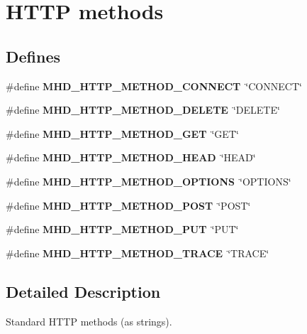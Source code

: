 \hypertarget{group__methods}{\section{\-H\-T\-T\-P methods}
\label{group__methods}
}
\subsection*{\-Defines}
\begin{DoxyCompactItemize}
\item 
\hypertarget{group__methods_gae328c5a44dfed584d65b72c46cf058e5}{\#define {\bfseries \-M\-H\-D\-\_\-\-H\-T\-T\-P\-\_\-\-M\-E\-T\-H\-O\-D\-\_\-\-C\-O\-N\-N\-E\-C\-T}~\char`\"{}\-C\-O\-N\-N\-E\-C\-T\char`\"{}}\label{group__methods_gae328c5a44dfed584d65b72c46cf058e5}

\item 
\hypertarget{group__methods_gae8a91999c163ab09633f5cb62f4bf216}{\#define {\bfseries \-M\-H\-D\-\_\-\-H\-T\-T\-P\-\_\-\-M\-E\-T\-H\-O\-D\-\_\-\-D\-E\-L\-E\-T\-E}~\char`\"{}\-D\-E\-L\-E\-T\-E\char`\"{}}\label{group__methods_gae8a91999c163ab09633f5cb62f4bf216}

\item 
\hypertarget{group__methods_ga430f578ef03fbfd74303abcf5acd7f2b}{\#define {\bfseries \-M\-H\-D\-\_\-\-H\-T\-T\-P\-\_\-\-M\-E\-T\-H\-O\-D\-\_\-\-G\-E\-T}~\char`\"{}\-G\-E\-T\char`\"{}}\label{group__methods_ga430f578ef03fbfd74303abcf5acd7f2b}

\item 
\hypertarget{group__methods_ga9ef1466c695f091284d8aaec10f913e4}{\#define {\bfseries \-M\-H\-D\-\_\-\-H\-T\-T\-P\-\_\-\-M\-E\-T\-H\-O\-D\-\_\-\-H\-E\-A\-D}~\char`\"{}\-H\-E\-A\-D\char`\"{}}\label{group__methods_ga9ef1466c695f091284d8aaec10f913e4}

\item 
\hypertarget{group__methods_ga2c8b702956ee0248347881c5c9418f86}{\#define {\bfseries \-M\-H\-D\-\_\-\-H\-T\-T\-P\-\_\-\-M\-E\-T\-H\-O\-D\-\_\-\-O\-P\-T\-I\-O\-N\-S}~\char`\"{}\-O\-P\-T\-I\-O\-N\-S\char`\"{}}\label{group__methods_ga2c8b702956ee0248347881c5c9418f86}

\item 
\hypertarget{group__methods_gac1a4120cc42b58e718baab0ea8ccc1ae}{\#define {\bfseries \-M\-H\-D\-\_\-\-H\-T\-T\-P\-\_\-\-M\-E\-T\-H\-O\-D\-\_\-\-P\-O\-S\-T}~\char`\"{}\-P\-O\-S\-T\char`\"{}}\label{group__methods_gac1a4120cc42b58e718baab0ea8ccc1ae}

\item 
\hypertarget{group__methods_gad2cc64746656a3fe79e60ab1b0a9a49c}{\#define {\bfseries \-M\-H\-D\-\_\-\-H\-T\-T\-P\-\_\-\-M\-E\-T\-H\-O\-D\-\_\-\-P\-U\-T}~\char`\"{}\-P\-U\-T\char`\"{}}\label{group__methods_gad2cc64746656a3fe79e60ab1b0a9a49c}

\item 
\hypertarget{group__methods_ga28521b63cbe44f6798a2a0930f370c96}{\#define {\bfseries \-M\-H\-D\-\_\-\-H\-T\-T\-P\-\_\-\-M\-E\-T\-H\-O\-D\-\_\-\-T\-R\-A\-C\-E}~\char`\"{}\-T\-R\-A\-C\-E\char`\"{}}\label{group__methods_ga28521b63cbe44f6798a2a0930f370c96}

\end{DoxyCompactItemize}


\subsection{\-Detailed \-Description}
\-Standard \-H\-T\-T\-P methods (as strings). 